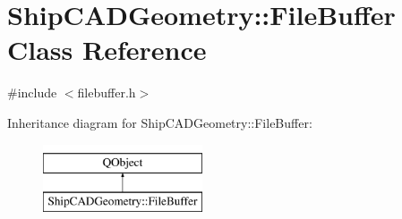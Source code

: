 \hypertarget{classShipCADGeometry_1_1FileBuffer}{\section{Ship\-C\-A\-D\-Geometry\-:\-:File\-Buffer Class Reference}
\label{classShipCADGeometry_1_1FileBuffer}
}


{\ttfamily \#include $<$filebuffer.\-h$>$}

Inheritance diagram for Ship\-C\-A\-D\-Geometry\-:\-:File\-Buffer\-:\begin{figure}[H]
\begin{center}
\leavevmode
\includegraphics[height=2.000000cm]{classShipCADGeometry_1_1FileBuffer}
\end{center}
\end{figure}
